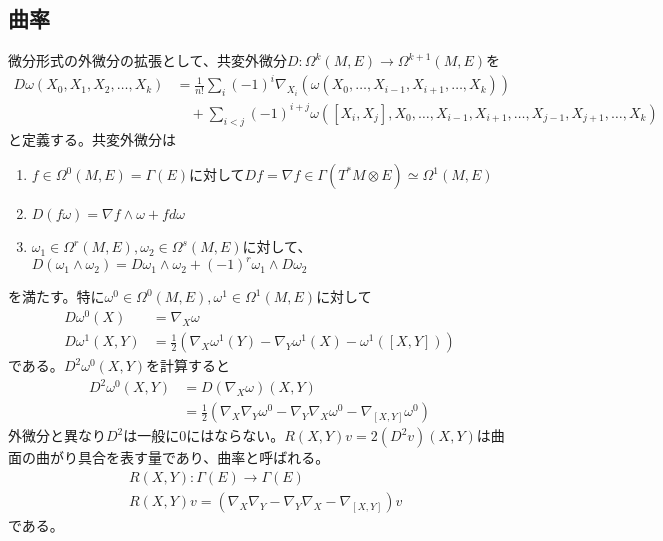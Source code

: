 \subsection{曲率}
    微分形式の外微分の拡張として、共変外微分$D: \Omega^k(M, E) \rightarrow \Omega^{k+1}(M, E)$を
    \begin{align*}
        D\omega(X_0, X_1, X_2, \dots, X_k)
            &= \frac{1}{n!}\sum_i (-1)^i \nabla_{X_i}(\omega(X_0, \dots, X_{i-1}, X_{i+1}, \dots, X_k))\\
            &\quad + \sum_{i<j} (-1)^{i+j} \omega([X_i, X_j], X_0, \dots, X_{i-1}, X_{i+1}, \dots, X_{j-1}, X_{j+1}, \dots, X_k)
    \end{align*}
    と定義する。共変外微分は
    \begin{enumerate}
        \item $f \in \Omega^0(M, E) = \Gamma(E)$に対して$Df = \nabla f \in \Gamma(T^*M \otimes E) \simeq \Omega^1(M, E)$
        \item $D(f\omega) = \nabla f \wedge \omega + f d\omega$
        \item $\omega_1 \in \Omega^r(M, E), \omega_2 \in \Omega^s(M, E)$に対して、$D(\omega_1 \wedge \omega_2) = D\omega_1 \wedge \omega_2 + (-1)^r \omega_1 \wedge D\omega_2$
    \end{enumerate}
    を満たす。特に$\omega^0 \in \Omega^0(M, E), \omega^1 \in \Omega^1(M, E)$に対して
    \begin{align*}
        D\omega^0(X) &= \nabla_X\omega\\
        D\omega^1(X, Y) &= \frac{1}{2}(\nabla_X\omega^1(Y) - \nabla_Y\omega^1(X) - \omega^1([X, Y]))
    \end{align*}
    である。$D^2\omega^0(X, Y)$を計算すると
    \begin{align*}
        D^2\omega^0(X, Y)
            &= D(\nabla_X\omega)(X, Y)\\
            &= \frac{1}{2}(\nabla_X\nabla_Y\omega^0 - \nabla_Y\nabla_X\omega^0 - \nabla_{[X, Y]}\omega^0)
    \end{align*}
    外微分と異なり$D^2$は一般に0にはならない。$R(X, Y)v = 2(D^2v)(X, Y)$は曲面の曲がり具合を表す量であり、曲率と呼ばれる。
    \begin{align*}
        &R(X, Y): \Gamma(E) \rightarrow \Gamma(E)\\
        &R(X, Y)v = (\nabla_X\nabla_Y - \nabla_Y\nabla_X - \nabla_{[X, Y]})v
    \end{align*}
    である。

